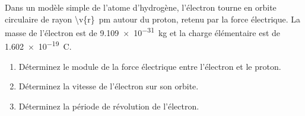 Dans un modèle simple de l'atome d'hydrogène, l'électron tourne en orbite circulaire de rayon \qty{\v{r}}{pm} autour du proton, retenu par la force électrique. La masse de l'électron est de \qty{9.109e-31}{kg} et la charge élémentaire est de \qty{1.602e-19}{C}.

\begin{enumerate}[label=\alph*)]
    \item Déterminez le module de la force électrique entre l'électron et le proton.
    \item Déterminez la vitesse de l'électron sur son orbite.
    \item Déterminez la période de révolution de l'électron.
\end{enumerate}
